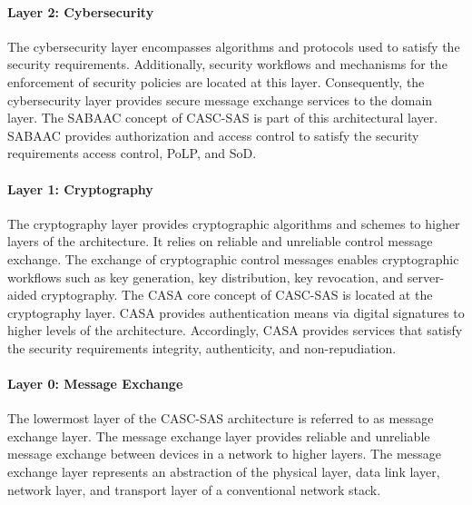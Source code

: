 \paragraph{Layer 2: Cybersecurity}
The cybersecurity layer encompasses algorithms and protocols used to satisfy the security requirements.
Additionally, security workflows and mechanisms for the enforcement of security policies are located at this layer.
Consequently, the cybersecurity layer provides secure message exchange services to the domain layer.
The SABAAC concept of CASC-SAS is part of this architectural layer.
SABAAC provides authorization and access control to satisfy the security requirements access control, PoLP, and SoD.

\paragraph{Layer 1: Cryptography}
The cryptography layer provides cryptographic algorithms and schemes to higher layers of the architecture.
It relies on reliable and unreliable control message exchange.
The exchange of cryptographic control messages enables cryptographic workflows such as key generation, key distribution, key revocation, and server-aided cryptography.
The CASA core concept of CASC-SAS is located at the cryptography layer.
CASA provides authentication means via digital signatures to higher levels of the architecture.
Accordingly, CASA provides services that satisfy the security requirements integrity, authenticity, and non-repudiation.

\paragraph{Layer 0: Message Exchange}
The lowermost layer of the CASC-SAS architecture is referred to as message exchange layer.
The message exchange layer provides reliable and unreliable message exchange between devices in a network to higher layers.
The message exchange layer represents an abstraction of the physical layer, data link layer, network layer, and transport layer of a conventional network stack.

